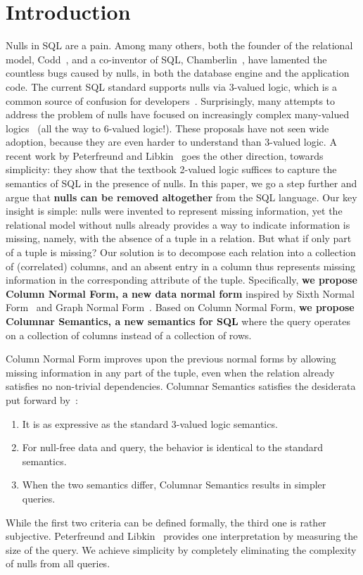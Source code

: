 \documentclass[sigconf,nonacm]{acmart}
\begin{document}
\section{Introduction}
Nulls in SQL are a pain.
Among many others,
 both the founder of the relational model, Codd~\cite{DBLP:books/aw/Codd90},
 and a co-inventor of SQL, Chamberlin~\cite{DBLP:conf/sigmod/Chamberlin23},
 have lamented the countless bugs caused by nulls,
 in both the database engine and the application code.
The current SQL standard supports nulls via 3-valued logic,
 which is a common source of confusion for developers~\cite{10.1145/3596673.3603142}.
Surprisingly, many attempts to address the problem of nulls
 have focused on increasingly complex many-valued logics~\cite{
  DBLP:conf/kr/ConsoleGL16,
  DBLP:journals/sigmod/Date08,
  DBLP:journals/sigmod/Gessert90,
  DBLP:conf/future/JiaFM92,
  10.1145/126482.126487} (all the way to 6-valued logic!).
These proposals have not seen wide adoption,
 because they are even harder to understand than 3-valued logic.
A recent work by Peterfreund and Libkin~\cite{DBLP:conf/pods/LibkinP23}
 goes the other direction, towards simplicity:
 they show that the textbook 2-valued logic suffices to capture 
 the semantics of SQL in the presence of nulls.
In this paper, we go a step further and argue that \textbf{nulls can be removed altogether}
 from the SQL language.
Our key insight is simple: nulls were invented to represent missing information,
 yet the relational model without nulls already provides a way to indicate information
 is missing, namely, with the absence of a tuple in a relation.
But what if only part of a tuple is missing?
Our solution is to decompose each relation into a collection of (correlated) columns,
 and an absent entry in a column thus represents missing information
 in the corresponding attribute of the tuple.
Specifically, \textbf{we propose Column Normal Form, 
 a new data normal form} inspired by Sixth Normal Form~\cite{DBLP:books/daglib/0014409} 
 and Graph Normal Form~\cite{RAIDocumentation}.
Based on Column Normal Form,
\textbf{we propose Columnar Semantics, a new semantics for SQL}
 where the query operates on a collection of columns instead of a collection of rows.

Column Normal Form improves upon the previous normal forms by allowing missing 
 information in any part of the tuple,
 even when the relation already satisfies no non-trivial dependencies.
Columnar Semantics satisfies the desiderata put forward by~\cite{DBLP:conf/pods/LibkinP23}:
 \begin{enumerate}
  \item It is as expressive as the standard 3-valued logic semantics.
  \item For null-free data and query, the behavior is identical to the standard semantics.
  \item When the two semantics differ, Columnar Semantics results in simpler queries.
 \end{enumerate}
While the first two criteria can be defined formally,
 the third one is rather subjective.
Peterfreund and Libkin~\cite{DBLP:conf/pods/LibkinP23} provides one interpretation 
 by measuring the size of the query.
We achieve simplicity by completely eliminating the complexity of nulls from all queries. 
\end{document}
